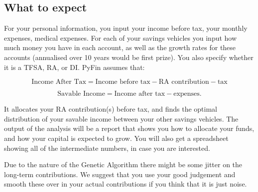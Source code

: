 \documentclass[a4paper, justified]{tufte-handout}
\begin{document}
\subsection{What to expect}

For your personal information, you input your income before tax, your monthly expenses, medical expenses. For each of your savings vehicles you input how much money you have in each account, as well as the growth rates for these accounts (annualised over 10 years would be first prize). You also specify whether it is a TFSA, RA, or DI. PyFin assumes that:

\begin{equation}
\textrm{Income After Tax} = \textrm{Income before tax} - \textrm{RA contribution} - \textrm{tax}
\end{equation}

\begin{equation}
\textrm{Savable Income} = \textrm{Income after tax} - \textrm{expenses}.
\end{equation}

It allocates your RA contribution(s) before tax, and finds the optimal distribution of your savable income between your other savings vehicles. The output of the analysis will be a report that shows you how to allocate your funds, and how your capital is expected to grow. You will also get a spreadsheet showing all of the intermediate numbers, in case you are interested.


Due to the nature of the Genetic Algorithm there might be some jitter on the long-term contributions. We suggest that you use your good judgement and smooth these over in your actual contributions if you think that it is just noise.
\end{document}
